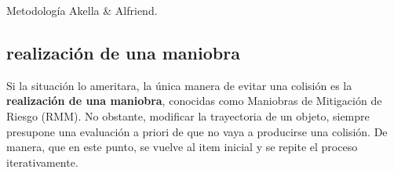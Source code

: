 Metodolog\'ia Akella \& Alfriend.\\

\subsection*{realizaci\'on de una maniobra}
Si la situaci\'on lo ameritara, la \'unica manera de evitar una colisi\'on es la {\bf{realizaci\'on de una maniobra}}, conocidas como Maniobras de Mitigaci\'on de Riesgo (RMM). No obstante, modificar la trayectoria de un objeto, siempre presupone una evaluaci\'on a priori de que no vaya a producirse una colisi\'on. De manera, que en este punto, se vuelve al item inicial y se repite el proceso iterativamente.\\ 







